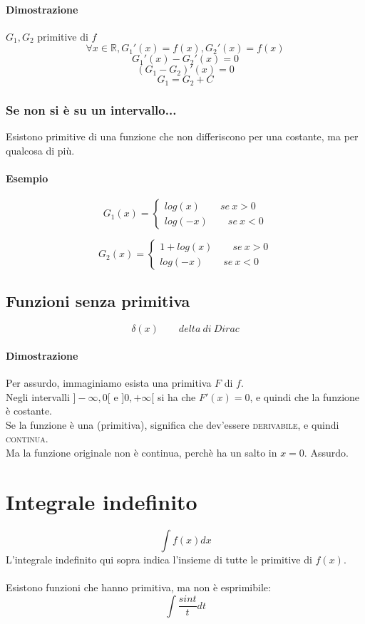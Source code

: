 \documentclass{article}
\begin{document}
\paragraph{Dimostrazione}
\(G_1, G_2\) primitive di \(f\)
\[\forall x \in \mathbb{R}, G_1'(x) = f(x), G_2'(x) = f(x)\]
\[G_1'(x) - G_2'(x) = 0\]
\[(G_1 - G_2)'(x) = 0\]
\[G_1 = G_2 + C\]

\subsubsection{Se non si è su un intervallo...}
Esistono primitive di una funzione che non differiscono per una costante, ma per qualcosa di più.
\paragraph{Esempio}
\[G_1(x) = \begin{cases}
    log(x) \qquad se\ x > 0\\
    log(-x) \qquad se\ x < 0
\end{cases}\]

\[G_2(x) = \begin{cases}
    1 + log(x) \qquad se\ x > 0\\
    log(-x) \qquad se\ x < 0
\end{cases}\]

\subsection{Funzioni senza primitiva}
\[\delta(x)\qquad delta\ di\ Dirac\]
\paragraph{Dimostrazione}
Per assurdo, immaginiamo esista una primitiva \(F\) di \(f\).\\
Negli intervalli \(]-\infty, 0[\) e \(]0, +\infty[\) si ha che \(F'(x) = 0\), e quindi che la funzione è costante.\\
Se la funzione è una \textsc(primitiva), significa che dev'essere \textsc{derivabile}, e quindi \textsc{continua}.\\
Ma la funzione originale non è continua, perchè ha un salto in \(x = 0\). Assurdo.

\section{Integrale indefinito}
\[\int f(x) dx\]
L'integrale indefinito qui sopra indica l'insieme di tutte le primitive di \(f(x)\).\\
\\
Esistono funzioni che hanno primitiva, ma non è esprimibile:
\[\int \frac{sin t}{t} dt\]
\end{document}
